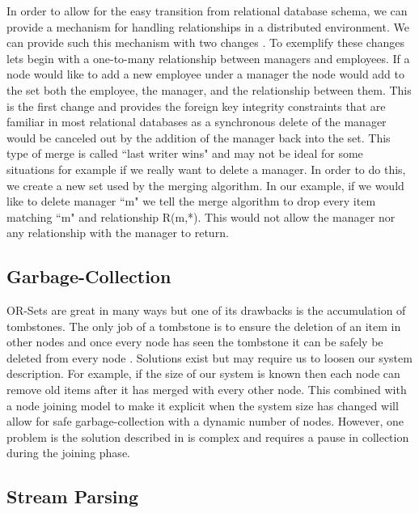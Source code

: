 \documentclass{article}
\begin{document}
\begin{multicols}{2}
\begin{refsection}
In order to allow for the easy transition from relational database schema, we can provide a mechanism for handling relationships in a distributed environment. We can provide such this mechanism with two changes \cite{balegas_making_2016}. To exemplify these changes lets begin with a one-to-many relationship between managers and employees. If a node would like to add a new employee under a manager the node would add to the set both the employee, the manager, and the relationship between them. This is the first change and provides the foreign key integrity constraints that are familiar in most relational databases as a synchronous delete of the manager would be canceled out by the addition of the manager back into the set. This type of merge is called ``last writer wins" and may not be ideal for some situations for example if we really want to delete a manager. In order to do this, we create a new set used by the merging algorithm. In our example, if we would like to delete manager ``m" we tell the merge algorithm to drop every item matching ``m" and relationship R(m,*). This would not allow the manager nor any relationship with the manager to return.

\subsection*{Garbage-Collection}

    OR-Sets are great in many ways but one of its drawbacks is the accumulation of tombstones. The only job of a tombstone is to ensure the deletion of an item in other nodes and once every node has seen the tombstone it can be safely be deleted from every node \cite{bauwens_memory_2019}. Solutions exist but may require us to loosen our system description. For example, if the size of our system is known then each node can remove old items after it has merged with every other node. This combined with a node joining model to make it explicit when the system size has changed will allow for safe garbage-collection with a dynamic number of nodes. However, one problem is the solution described in \cite{bauwens_memory_2019} is complex and requires a pause in collection during the joining phase.

\subsection*{Stream Parsing}


\end{refsection}
\end{multicols}
\end{document}
